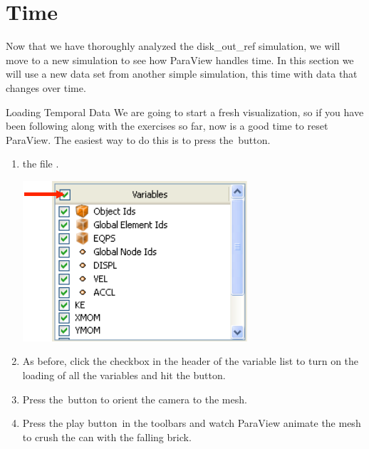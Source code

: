 \section{Time}

Now that we have thoroughly analyzed the disk\_out\_ref simulation, we will
move to a new simulation to see how ParaView handles time.  In this section
we will use a new data set from another simple simulation, this time with
data that changes over time.

\begin{exercise}{Loading Temporal Data}
  \label{ex:LoadingTemporalData}%
  We are going to start a fresh visualization, so if you have been
  following along with the exercises so far, now is a good time to reset
  ParaView.  The easiest way to do this is to press the~\disconnect button.

  \begin{enumerate}
  \item {} the file .
    \begin{inlinefig}
      \includegraphics{images/Variables_can}
    \end{inlinefig}
  \item As before, click the checkbox in the header of the variable list to
    turn on the loading of all the variables and hit the \apply button.
  \item Press the~\yPlus button to orient the camera to the mesh.
  \item Press the play button~\vcrPlay in the toolbars and watch ParaView
    animate the mesh to crush the can with the falling brick.
  \end{enumerate}


\end{exercise}
